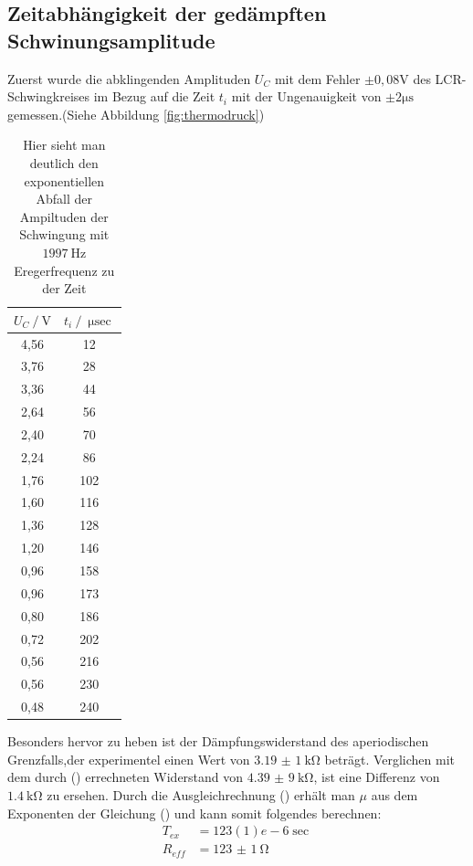 \documentclass{scrartcl}
\begin{document}
     \subsection[underline]{Zeitabhängigkeit der gedämpften Schwinungsamplitude}
     Zuerst wurde die abklingenden Amplituden $U_C$ mit dem Fehler $\pm{0,08}$$\si{\volt}$ des LCR-Schwingkreises im Bezug auf
     die Zeit $t_i$ mit der Ungenauigkeit von $\pm{2}$$\si{\micro\s}$ gemessen.(Siehe Abbildung \ref{fig:thermodruck})
     \begin{table}
       \centering
       \caption{Hier sieht man deutlich den exponentiellen Abfall der Ampiltuden der Schwingung mit $\SI{1997}{\hertz}$ Eregerfrequenz zu der Zeit}
       \label{tab:Daten1}
       \begin{tabular}{S S}
        \toprule
        {$U_C\:/\:\si{\volt}$} & {$t_i\:/\:\si{\micro\sec}$} \\
        ,56 & 12\\
       3,76 & 28\\
       3,36 & 44\\
       2,64 & 56\\
       2,40 & 70\\
       2,24 & 86\\
       1,76 & 102\\
       1,60 & 116\\
       1,36 & 128\\
       1,20 & 146\\
       0,96 & 158\\
       0,96 & 173\\
       0,80 & 186\\
       0,72 & 202\\
       0,56 & 216\\
       0,56 & 230\\
       0,48 & 240\\
        \bottomrule
       \end{tabular}
      \end{table}
     Besonders hervor zu heben ist der Dämpfungswiderstand des aperiodischen Grenzfalls,der experimentel einen Wert von $\SI{3,19(1)}{\kilo\ohm}$ beträgt.
     Verglichen mit dem durch () errechneten Widerstand von $\SI{4,39(9)}{\kilo\ohm}$, ist eine Differenz von ~ $\SI{1,4}{\kilo\ohm}$ zu ersehen.
     Durch die Ausgleichrechnung () erhält man $\mu$ aus dem Exponenten der Gleichung () und kann somit folgendes berechnen:
     \begin{align*}
      T_{ex} &= \si{123(1)e-6}{\sec}\\
      R_{eff} &= \SI{123(1)}{\ohm}
     \end{align*}
\end{document}
